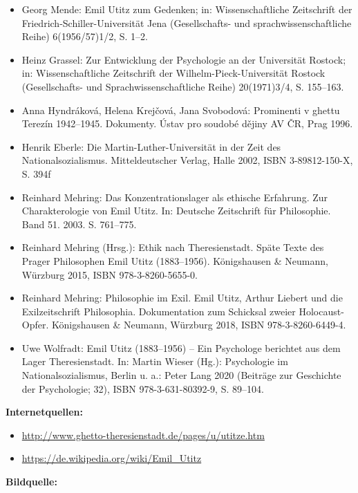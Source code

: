 \documentclass[a4paper]{article}
\begin{document}
\begin{itemize}
\item Georg Mende: Emil Utitz zum Gedenken; in: Wissenschaftliche Zeitschrift der Friedrich-Schiller-Universität Jena
(Gesellschafts- und sprachwissenschaftliche Reihe) 6(1956/57)1/2, S. 1–2.  
\item Heinz Grassel: Zur Entwicklung der Psychologie an der Universität Rostock; in: Wissenschaftliche Zeitschrift der
Wilhelm-Pieck-Universität Rostock (Gesellschafts- und Sprachwissenschaftliche Reihe) 20(1971)3/4, S. 155–163. 
\item  Anna Hyndráková, Helena Krejčová, Jana Svobodová: Prominenti v ghettu Terezín 1942–1945. Dokumenty. Ústav pro
soudobé dějiny AV ČR, Prag 1996.  
\item Henrik Eberle: Die Martin-Luther-Universität in der Zeit des Nationalsozialismus. Mitteldeutscher Verlag, Halle
2002, ISBN 3-89812-150-X, S. 394f  
\item Reinhard Mehring: Das Konzentrationslager als ethische Erfahrung. Zur Charakterologie von Emil Utitz. In: Deutsche
Zeitschrift für Philosophie. Band 51. 2003. S. 761–775.  
\item Reinhard Mehring (Hrsg.): Ethik nach Theresienstadt. Späte Texte des Prager Philosophen Emil Utitz (1883–1956).
Königshausen \& Neumann, Würzburg 2015, ISBN 978-3-8260-5655-0.  
\item Reinhard Mehring: Philosophie im Exil. Emil Utitz, Arthur Liebert und die Exilzeitschrift Philosophia.
Dokumentation zum Schicksal zweier Holocaust-Opfer. Königshausen \& Neumann, Würzburg 2018, ISBN 978-3-8260-6449-4.  
\item Uwe Wolfradt: Emil Utitz (1883–1956) – Ein Psychologe berichtet aus dem Lager Theresienstadt. In: Martin Wieser
(Hg.): Psychologie im Nationalsozialismus, Berlin u. a.: Peter Lang 2020 (Beiträge zur Geschichte der Psychologie; 32),
ISBN 978-3-631-80392-9, S. 89–104.
\end{itemize}

\bigskip

\textbf{Internetquellen:}

\begin{itemize}
\item \url{http://www.ghetto-theresienstadt.de/pages/u/utitze.htm} 
\item \url{https://de.wikipedia.org/wiki/Emil_Utitz} 
\end{itemize}

\bigskip

\textbf{Bildquelle:}
\end{document}
